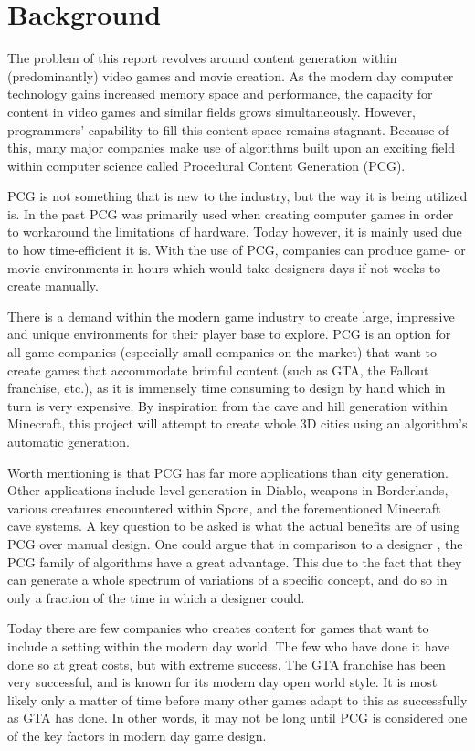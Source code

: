 \section{Background}
The problem of this report revolves around content generation within (predominantly) video games and movie creation. 
As the modern day computer technology gains increased memory space and performance, the capacity for content in video games and similar fields grows simultaneously. 
However, programmers' capability to fill this content space remains stagnant. 
Because of this, many major companies make use of algorithms  built upon an exciting field within computer science called Procedural Content Generation (PCG). 

PCG is not something that is new to the industry, but the way it is being utilized is.
In the past PCG was primarily used when creating computer games  in order to workaround the limitations of hardware.
Today however, it is mainly used due to how time-efficient it is. 
With the use of PCG, companies can produce game- or movie environments in hours which would take designers days if not weeks to create manually.

There is a demand within the modern game industry to create large, impressive and unique environments for their player base to explore. 
PCG is an option for all game companies (especially small companies on the market) that want to create games that accommodate brimful content (such as GTA, the Fallout franchise, etc.), as it is immensely time consuming to design by hand which in turn is very expensive. 
By inspiration from the cave and hill generation within Minecraft, this project will attempt to create whole 3D cities using an algorithm's automatic generation. 

Worth mentioning is that PCG has far more applications than city generation.
Other applications include level generation in Diablo, weapons in Borderlands, various creatures encountered within Spore, and the forementioned Minecraft cave systems. 
A key question to be asked is what the actual benefits are of using PCG over manual design. 
One could argue that in comparison to a designer , the PCG family of algorithms have a great advantage. This due to the fact that they can generate a whole spectrum of variations of a specific concept, and do so in only a fraction of the time in which a designer could. 

Today there are few companies who creates content for games that want to include a setting within the modern day world. 
The few who have done it have done so at great costs, but with extreme success.
The GTA franchise has been very successful, and is known for its modern day open world style. 
It is most likely only a matter of time before many other games adapt to this as successfully as GTA has done. 
In other words, it may not be long until PCG is considered one of the key factors in modern day game design.

